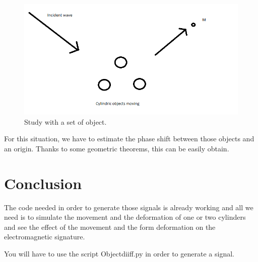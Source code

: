 \begin{figure}[H]
\centering
    \includegraphics[scale=0.6,angle=0]{Images/Image4.png}
    \caption{Study with a set of object.}
    \label{fig:Image4}
\end{figure}

For this situation, we have to estimate the phase shift between those objects and an origin. Thanks to some geometric theorems, this can be easily obtain. 


\bigskip

\chapter*{Conclusion}
The code needed in order to generate those signals is already working and all we need is to simulate the movement and the deformation of one or two cylinders and see the effect of the movement and the form deformation on the electromagnetic signature.

You will have to use the script Objectdiiff.py in order to generate a signal.